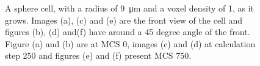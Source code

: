 \begin{figure}[ht]
\begin{center}
{	}
	\end{center}
	\begin{center}
	\end{center}
	\caption[Growth of a sphere cell with a radius of 9]{\label{img:GrowthSphereCellRadius9}A sphere cell, with a radius of \SI{9}{\micro\metre} and a voxel density of 1, as it grows. Images (a), (c) and (e) are the front view of the cell and figures (b), (d) and(f) have around a 45 degree angle of the front. Figure (a) and (b) are at \ac{MCS} 0, images (c) and (d) at calculation step 250 and figures (e) and (f) present \ac{MCS} 750.}
\end{figure}


